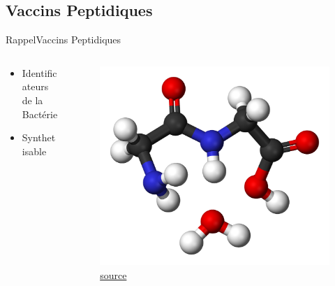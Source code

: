 \documentclass{PresentationHEIGVD}
\begin{document}
\subsection{Vaccins Peptidiques}
\begin{frame}{Rappel}{Vaccins Peptidiques}
\begin{columns}[c]
	\begin{column}[c]{5cm}
		\begin{itemize}[<+->]
			\item Identificateurs de la Bactérie
			\item Synthetisable
		\end{itemize}
	\end{column}
	\begin{column}[c]{5cm}	
		\begin{figure}
		\includegraphics[width=\textwidth]{img/peptide}
		\caption{\href{https://upload.wikimedia.org/wikipedia/commons/9/94/Glycine-condensation-2-3D-balls.png}{source}}
	\end{figure}
	\end{column}
\end{columns}
\end{frame}
\end{document}
